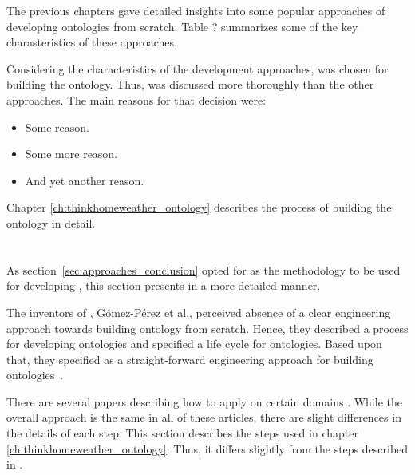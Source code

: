 The previous chapters gave detailed insights into some popular approaches of developing ontologies from scratch. Table ? summarizes some of the key charasteristics of these approaches.


Considering the characteristics of the development approaches, \methontology was chosen for building the \thinkhomeweather ontology. Thus, \methontology was discussed more thoroughly than the other approaches. The main reasons for that decision were:

\begin{itemize}
  \item Some reason.
  \item Some more reason.
  \item And yet another reason.
\end{itemize}

Chapter \ref{ch:thinkhomeweather_ontology} describes the process of building the \thinkhomeweather ontology in detail.

\section{\methontology}

As section~\ref{sec:approaches_conclusion} opted for \methontology as the methodology to be used for developing \thinkhomeweather, this section presents \methontology in a more detailed manner.

\vspace{1em}

The inventors of \methontology, Gómez-Pérez et al., perceived absence of a clear engineering approach towards building ontology from scratch. Hence, they described a process for developing ontologies and specified a life cycle for ontologies. Based upon that, they specified \methontology as a straight-forward engineering approach for building ontologies~\cite{Methontology}.



There are several papers describing how to apply \methontology on certain domains \cite{MethontologyLegal} \cite{MethontologyChemical}. While the overall approach is the same in all of these articles, there are slight differences in the details of each step. This section describes the steps used in chapter \ref{ch:thinkhomeweather_ontology}. Thus, it differs slightly from the steps described in \cite{Methontology}.

